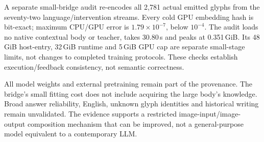 A separate small-bridge audit re-encodes all 2,781 actual emitted glyphs from
the seventy-two language/intervention streams. Every cold GPU embedding hash
is bit-exact; maximum CPU/GPU error is $1.79\times10^{-7}$, below $10^{-4}$.
The audit loads no native contextual body or teacher, takes 30.80\,s and peaks
at 0.351\,GiB. Its 48\,GiB host-entry, 32\,GiB runtime and 5\,GiB GPU cap are
separate small-stage limits, not changes to completed training protocols.
These checks establish execution/feedback consistency, not semantic correctness.

All model weights and external pretraining remain part of the provenance.
The bridge's small fitting cost does not include acquiring the large body's
knowledge. Broad answer reliability, English, unknown glyph identities and
historical writing remain unvalidated. The evidence supports a restricted
image-input/image-output composition mechanism that can be improved, not a
general-purpose model equivalent to a contemporary LLM.

\clearpage
{}
